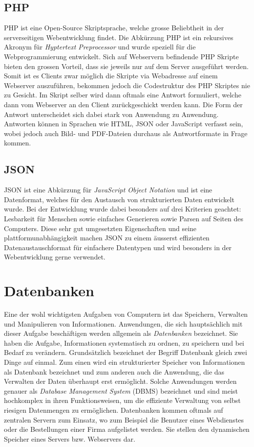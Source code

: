 \documentclass[../main.tex]{subfiles}
\begin{document}
	\subsection{PHP}\label{php}
	PHP ist eine Open-Source Skriptsprache, welche grosse Beliebtheit in der serverseitigen Webentwicklung findet. Die Abkürzung PHP ist ein rekursives Akronym für \emph{Hyptertext Preprocessor} und wurde speziell für die Webprogrammierung entwickelt. Sich auf Webservern befindende PHP Skripte bieten den grossen Vorteil, dass sie jeweils nur auf dem Server ausgeführt werden. Somit ist es Clients zwar möglich die Skripte via Webadresse auf einem Webserver auszuführen, bekommen jedoch die Codestruktur des PHP Skriptes nie zu Gesicht. \cite{PHP} Im Skript selber wird dann oftmals eine Antwort formuliert, welche dann vom Webserver an den Client zurückgeschickt werden kann. Die Form der Antwort unterscheidet sich dabei stark von Anwendung zu Anwendung. Antworten können in Sprachen wie HTML, JSON oder JavaScript verfasst sein, wobei jedoch auch Bild- und PDF-Dateien durchaus als Antwortformate in Frage kommen.\cite{PHP:function}
	
	\subsection{JSON}
	JSON ist eine Abkürzung für \emph{JavaScript Object Notation} und ist eine Datenformat, welches für den Austausch von strukturierten Daten entwickelt wurde. Bei der Entwicklung wurde dabei besonders auf drei Kriterien geachtet: Lesbarkeit für Menschen sowie einfaches Generieren sowie Parsen auf Seiten des Computers. Diese sehr gut umgesetzten Eigenschaften und seine plattformunabhängigkeit  machen JSON zu einem äusserst effizienten Datenaustauschformat für einfachere Datentypen und wird besonders in der Webentwicklung gerne verwendet. \cite{JSON}
	
	\section{Datenbanken} \label{Datenbanken}
	Eine der wohl wichtigsten Aufgaben von Computern ist das Speichern, Verwalten und Manipulieren von Informationen. Anwendungen, die sich hauptsächlich mit dieser Aufgabe beschäftigen werden allgemein als \emph{Datenbanken} bezeichnet. Sie haben die Aufgabe, Informationen systematisch zu ordnen, zu speichern und bei Bedarf zu verändern. Grundsätzlich bezeichnet der Begriff Datenbank gleich zwei Dinge auf einmal. Zum einen wird ein strukturierter Speicher von Informationen als Datenbank bezeichnet und zum anderen auch die Anwendung, die das Verwalten der Daten überhaupt erst ermöglicht. Solche Anwendungen werden genauer als \emph{Database Management System} (DBMS) bezeichnet und sind meist hochkomplex in ihren Funktionsweisen, um die effiziente Verwaltung von selbst riesigen Datenmengen zu ermöglichen. \cite{IT-Handbuch} Datenbanken kommen oftmals auf zentralen Servern zum Einsatz, wo zum Beispiel die Benutzer eines Webdienstes oder die Bestellungen einer Firma aufgelistet werden. Sie stellen den dynamischen Speicher eines Servers bzw. Webservers dar.
	
\end{document}
